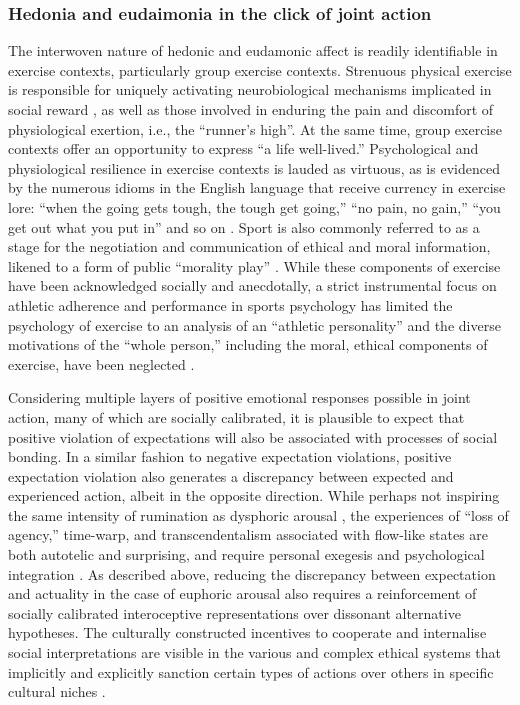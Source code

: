 \begin{CJK}{UTF8}{gbsn}
\subsubsection{Hedonia and eudaimonia in the click of joint action}
  The interwoven nature of hedonic and eudamonic affect is readily identifiable in exercise contexts, particularly group exercise contexts.  Strenuous physical exercise is responsible for uniquely activating neurobiological mechanisms implicated in social reward \citep{Dunbar2010,Eisenberger2012}, as well as those involved in enduring the pain and discomfort of physiological exertion, i.e., the ``runner’s high''\citep{Boecker2008,Dietrich2004,Sullivan2014,Tarr2015}. At the same time, group exercise contexts offer an opportunity to express ``a life well-lived.''  Psychological and physiological resilience in exercise contexts is lauded as virtuous, as is evidenced by the numerous idioms in the English language that receive currency in exercise lore: ``when the going gets tough, the tough get going,'' ``no pain, no gain,'' ``you get out what you put in'' and so on \citep{Sarkar2014}.  Sport is also commonly referred to as a stage for the negotiation and communication of ethical and moral information, likened to a form of public ``morality play'' \citep{McNamee2008}.  While these components of exercise have been acknowledged socially and anecdotally, a strict instrumental focus on athletic adherence and performance in sports psychology has limited the psychology of exercise to an analysis of an ``athletic personality'' and the diverse motivations of the ``whole person,'' including the moral, ethical components of exercise, have been neglected \citep{Beedie2015,Coulter2015,Laborde2014}.

Considering multiple layers of positive emotional responses possible in joint action, many of which are socially calibrated, it is plausible to expect that positive violation of expectations will also be associated with processes of social bonding.  In a similar fashion to negative expectation violations, positive expectation violation also generates a discrepancy between expected and experienced action, albeit in the opposite direction.  While perhaps not inspiring the same intensity of rumination as dysphoric arousal \citep{Russell2014}, the experiences of ``loss of agency,'' time-warp, and transcendentalism associated with flow-like states are both autotelic and surprising, and require personal exegesis and psychological integration \citep{Jackson1995,Whitehouse2004}.  As described above, reducing the discrepancy between expectation and actuality in the case of euphoric arousal also requires a reinforcement of socially calibrated interoceptive representations over dissonant alternative hypotheses.   The culturally constructed incentives to cooperate and internalise social interpretations are visible in the various and complex ethical systems that implicitly and explicitly sanction certain types of actions over others in specific cultural niches \citep{Slingerland2014}.




\end{CJK}
